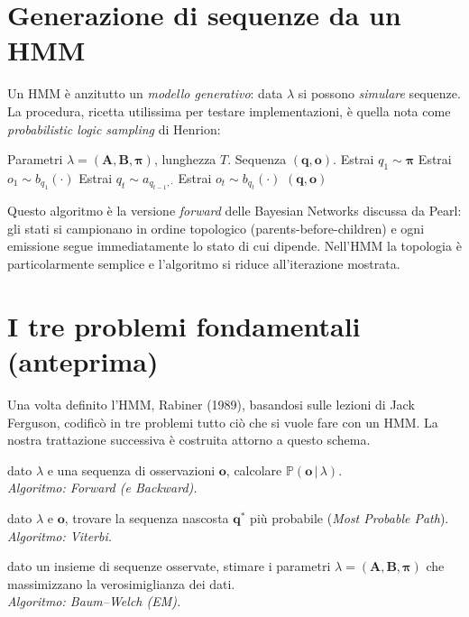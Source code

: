 \documentclass[11pt,a4paper,oneside]{book}
\theoremstyle{plain}
\theoremstyle{definition}
\theoremstyle{remark}
\newcommand{\Prob}{\mathbb{P}}
\newcommand{\Amat}{\mathbf{A}}               %
\newcommand{\Bmat}{\mathbf{B}}               %
\newcommand{\initvec}{\boldsymbol{\pi}}      %
\newcommand{\hmm}{\lambda}                   %
\newcommand{\Tlen}{T}                        %
\newcommand{\seqobs}{\mathbf{o}}             %
\newcommand{\seqstates}{\mathbf{q}}          %
\newcommand{\given}{\,\vert\,}
\begin{document}
\section{Generazione di sequenze da un HMM}

Un HMM è anzitutto un \emph{modello generativo}: data $\hmm$ si
possono \emph{simulare} sequenze. La procedura, ricetta utilissima
per testare implementazioni, è quella nota come \emph{probabilistic
logic sampling} di Henrion:

\begin{algorithm}[H]
\caption{Generazione di una sequenza da un HMM}
\label{alg:hmm_generate}
\begin{algorithmic}[1]
\Require Parametri $\hmm=(\Amat,\Bmat,\initvec)$, lunghezza $\Tlen$.
\Ensure Sequenza $(\seqstates,\seqobs)$.
\State Estrai $q_1 \sim \initvec$ 
\State Estrai $o_1 \sim b_{q_1}(\cdot)$ 
\For{$t = 2$ \textbf{to} $\Tlen$}
    \State Estrai $q_t \sim a_{q_{t-1},\cdot}$ 
    \State Estrai $o_t \sim b_{q_t}(\cdot)$ 
\EndFor
\State \Return $(\seqstates,\seqobs)$
\end{algorithmic}
\end{algorithm}

Questo algoritmo è la versione \emph{forward} delle Bayesian Networks
discussa da Pearl: gli stati si campionano in ordine topologico
(parents-before-children) e ogni emissione segue immediatamente lo
stato di cui dipende. Nell'HMM la topologia è particolarmente
semplice e l'algoritmo si riduce all'iterazione mostrata.

\section{I tre problemi fondamentali (anteprima)}

Una volta definito l'HMM, Rabiner (1989), basandosi sulle lezioni di
Jack Ferguson, codificò in tre problemi tutto ciò che si vuole fare
con un HMM. La nostra trattazione successiva è costruita attorno a
questo schema.

\begin{tcolorbox}[notebox,title=I tre problemi fondamentali degli HMM]
\begin{description}[leftmargin=*,style=nextline]
    \item[Problema 1 -- Evaluation (likelihood):]
    dato $\hmm$ e una sequenza di osservazioni $\seqobs$,
    calcolare $\Prob(\seqobs\given\hmm)$.\\
    \emph{Algoritmo: Forward (e Backward).}
    \item[Problema 2 -- Decoding:]
    dato $\hmm$ e $\seqobs$, trovare la sequenza nascosta $\seqstates^*$
    più probabile (\emph{Most Probable Path}).\\
    \emph{Algoritmo: Viterbi.}
    \item[Problema 3 -- Learning:]
    dato un insieme di sequenze osservate, stimare i parametri
    $\hmm=(\Amat,\Bmat,\initvec)$ che massimizzano la verosimiglianza
    dei dati.\\
    \emph{Algoritmo: Baum--Welch (EM).}
\end{description}
\end{tcolorbox}
\end{document}
